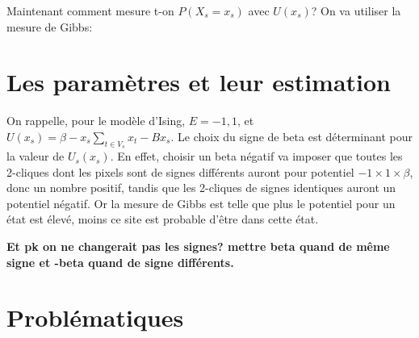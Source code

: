 \documentclass[fleqn]{article} %
\begin{document}
Maintenant comment mesure t-on $P(X_s=x_s)$ avec $U(x_s)$? On va utiliser la mesure de Gibbs:




\section{Les paramètres et leur estimation}

On rappelle, pour le modèle d'Ising, $E={-1,1}$, et $U(x_s) = \beta -x_s\sum_{t\in V_s}{x_t} -  Bx_s$.
Le choix du signe de beta est déterminant pour la valeur de $U_s(x_s)$. En effet, choisir un beta négatif va imposer que toutes les 2-cliques dont les pixels sont de signes différents auront pour potentiel $-1\times 1\times\beta$, donc un nombre positif, tandis que les 2-cliques de signes identiques auront un potentiel négatif. Or la mesure de Gibbs est telle que plus le potentiel pour un état est élevé, moins ce site est probable d'être dans cette état.


\textbf{Et pk on ne changerait pas les signes? mettre beta quand de même signe et -beta quand de signe différents.}




\section{Problématiques}
\end{document}
